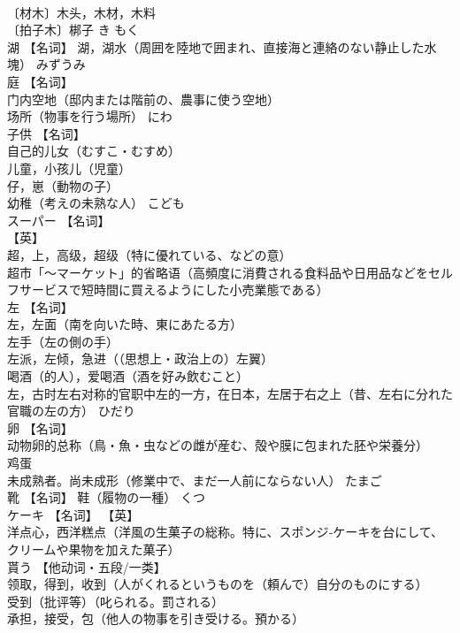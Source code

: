 \documentclass[8pt]{extreport}
\begin{document}
\begin{CJK}{UTF8}{min}
\\	〔材木〕木头，木材，木料 
\\	〔拍子木〕梆子	き もく	
\\	湖	【名词】 湖，湖水（周囲を陸地で囲まれ、直接海と連絡のない静止した水塊）	みずうみ	
\\	庭	【名词】 
\\	门内空地（邸内または階前の、農事に使う空地） 
\\	场所（物事を行う場所）	にわ	
\\	子供	【名词】 
\\	自己的儿女（むすこ・むすめ） 
\\	儿童，小孩儿（児童） 
\\	仔，崽（動物の子） 
\\	幼稚（考えの未熟な人）	こども	
\\	スーパー	【名词】 
\\	【英】
\\	超，上，高级，超级（特に優れている、などの意） 
\\	超市「～マーケット」的省略语（高頻度に消費される食料品や日用品などをセルフサービスで短時間に買えるようにした小売業態である）		
\\	左	【名词】 
\\	左，左面（南を向いた時、東にあたる方） 
\\	左手（左の側の手） 
\\	左派，左倾，急进（（思想上・政治上の）左翼） 
\\	喝酒（的人），爱喝酒（酒を好み飲むこと） 
\\	左，古时左右对称的官职中左的一方，在日本，左居于右之上（昔、左右に分れた官職の左の方）	ひだり	
\\	卵	【名词】 
\\	动物卵的总称（鳥・魚・虫などの雌が産む、殻や膜に包まれた胚や栄養分） 
\\	鸡蛋 
\\	未成熟者。尚未成形（修業中で、まだ一人前にならない人）	たまご	
\\	靴	【名词】 鞋（履物の一種）	くつ	
\\	ケーキ	【名词】 【英】
\\	洋点心，西洋糕点（洋風の生菓子の総称。特に、スポンジ‐ケーキを台にして、クリームや果物を加えた菓子）		
\\	貰う	【他动词・五段/一类】 
\\	领取，得到，收到（人がくれるというものを（頼んで）自分のものにする） 
\\	受到（批评等）（叱られる。罰される） 
\\	承担，接受，包（他人の物事を引き受ける。預かる） 

\end{CJK}
\end{document}
